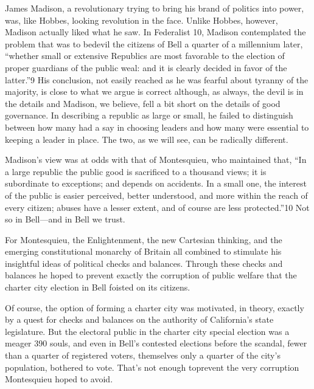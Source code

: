 \documentclass[10pt]{article}
\begin{document}
{\large James Madison, a revolutionary trying to bring his brand of politics
into power, was, like Hobbes, looking revolution in the face. Unlike Hobbes,
however, Madison actually liked what he saw. In Federalist 10, Madison
contemplated the problem that was to bedevil the citizens of Bell a quarter of a
millennium later, ``whether small or extensive Republics are most favorable to
the election of proper guardians of the public weal: and it is clearly decided in
favor of the latter.''9 His conclusion, not easily reached as he was fearful
about tyranny of the majority, is close to what we argue is correct although, as
always, the devil is in the details and Madison, we believe, fell a bit short on
the details of good governance. In describing a republic as large or small, he
failed to distinguish between how many had a say in choosing leaders and how many
were essential to keeping a leader in place. The two, as we will see, can be
radically different.}

{\large Madison's view was at odds with that of Montesquieu, who maintained
that, ``In a large republic the public good is sacrificed to a thousand views; it
is subordinate to exceptions; and depends on accidents. In a small one, the
interest of the public is easier perceived, better understood, and more within
the reach of every citizen; abuses have a lesser extent, and of course are less
protected.''10 Not so in Bell---and in Bell we trust.}

{\large For Montesquieu, the Enlightenment, the new Cartesian thinking, and the
emerging constitutional monarchy of Britain all combined to stimulate his
insightful ideas of political checks and balances. Through these checks and
balances he hoped to prevent exactly the corruption of public welfare that the
charter city election in Bell foisted on its citizens.}

{\large Of course, the option of forming a charter city was motivated, in
theory, exactly by a quest for checks and balances on the authority of
California's state legislature. But the electoral public in the charter city
special election was a meager 390 souls, and even in Bell's contested elections
before the scandal, fewer than a quarter of registered voters, themselves only a
quarter of the city's population, bothered to vote. That's not enough toprevent
the very corruption Montesquieu hoped to avoid.}
\end{document}

